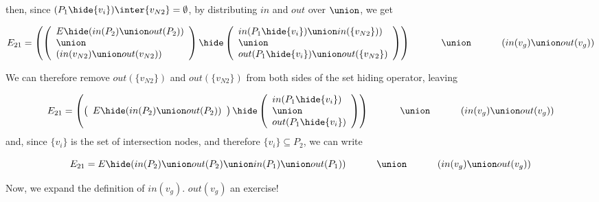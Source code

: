 \noindent
then, since $(P_1\hide\{v_i\}) \inter \{v_{N2}\} = \emptyset$, by distributing $in$ and $out$ over $\union$, we get  

\[
E_{21}  =  \left( \left(
  \begin{array}{l}
    E\hide(in(P_2) \union out(P_2)) \\  \union \\ (in(v_{N2}) \union out(v_{N2}) ) \\
  \end{array} \right)
   \hide
   \left( \begin{array}{l}
     in(P_1\hide\{v_i\})\union in(\{v_{N2}\})) \\\union\\ out(P_1\hide\{v_i\})\union out(\{v_{N2}\})
   \end{array}
   \right) \right) \\
   \hphantom{E_{12}  = \;\; }   \union\ \\
\hphantom{E_{12}  = \;\;}   (in(v_g) \union out(v_g))\\ 
\]

\noindent
We can therefore remove $out(\{v_{N2}\})$ and $out(\{v_{N2}\})$ from both sides of the set hiding operator, leaving 

\[
E_{21}  =  \left( \left(
  \begin{array}{l}
    E\hide(in(P_2) \union out(P_2)) \\  
  \end{array} \right)
   \hide
   \left( \begin{array}{l}
     in(P_1\hide\{v_i\}) \\\union\\ out(P_1\hide\{v_i\})
   \end{array}
   \right) \right) \\
   \hphantom{E_{12}  = \;\; }   \union\ \\
\hphantom{E_{12}  = \;\;}   (in(v_g) \union out(v_g))\\ 
\]
\noindent
and, since $\{v_i\}$ is the set of intersection nodes, and therefore $\{v_i\} \subseteq P_2$, we can write

\[
E_{21}  =  
   E\hide
  (
    in(P_2) \union out(P_2) \union in(P_1) \union out(P_1)
  ) \\
   \hphantom{E_{12}  = \;\;}   \union\ \\
\hphantom{E_{12}  = \;\;}   (in(v_g) \union out(v_g))\\ 
\]



Now, we expand the definition of $in(v_g)$. $out(v_g)$ an exercise!

